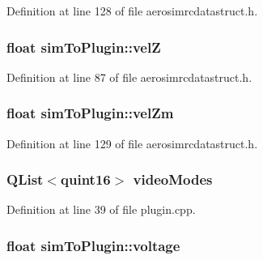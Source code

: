 \-Definition at line 128 of file aerosimrcdatastruct.\-h.

\hypertarget{group___aero_sim_r_c_ga2703ca3343da97af3ee57b5e6f36cbb9}{
\subsubsection[{vel\-Z}]{\setlength{\rightskip}{0pt plus 5cm}float {\bf sim\-To\-Plugin\-::vel\-Z}}}\label{group___aero_sim_r_c_ga2703ca3343da97af3ee57b5e6f36cbb9}


\-Definition at line 87 of file aerosimrcdatastruct.\-h.

\hypertarget{group___aero_sim_r_c_ga35865106b3179109ebbec06aed189fad}{
\subsubsection[{vel\-Zm}]{\setlength{\rightskip}{0pt plus 5cm}float {\bf sim\-To\-Plugin\-::vel\-Zm}}}\label{group___aero_sim_r_c_ga35865106b3179109ebbec06aed189fad}


\-Definition at line 129 of file aerosimrcdatastruct.\-h.

\hypertarget{group___aero_sim_r_c_ga56a26014d5fb746423472ca6301beff3}{
\subsubsection[{video\-Modes}]{\setlength{\rightskip}{0pt plus 5cm}\-Q\-List$<$quint16$>$ {\bf video\-Modes}}}\label{group___aero_sim_r_c_ga56a26014d5fb746423472ca6301beff3}


\-Definition at line 39 of file plugin.\-cpp.

\hypertarget{group___aero_sim_r_c_ga598e987b250d694aeaced9fb921e03bd}{
\subsubsection[{voltage}]{\setlength{\rightskip}{0pt plus 5cm}float {\bf sim\-To\-Plugin\-::voltage}}}\label{group___aero_sim_r_c_ga598e987b250d694aeaced9fb921e03bd}


